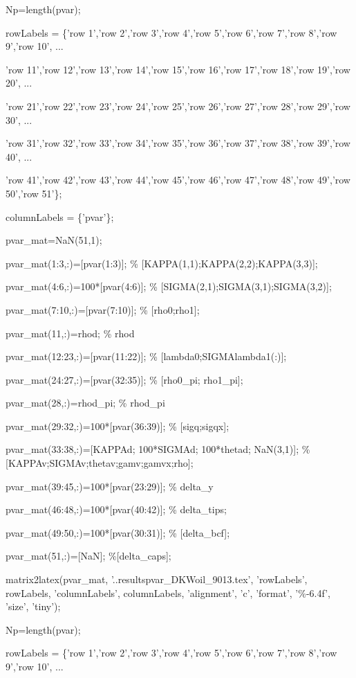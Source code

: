 \documentclass{article}
\begin{document}
Np=length(pvar);

rowLabels = \{'row 1','row 2','row 3','row 4','row 5','row 6','row 7','row
8','row 9','row 10', ...

'row 11','row 12','row 13','row 14','row 15','row 16','row 17','row 18','row
19','row 20', ...

'row 21','row 22','row 23','row 24','row 25','row 26','row 27','row 28','row
29','row 30', ...

'row 31','row 32','row 33','row 34','row 35','row 36','row 37','row 38','row
39','row 40', ...

'row 41','row 42','row 43','row 44','row 45','row 46','row 47','row 48','row
49','row 50','row 51'\};

columnLabels = \{'pvar'\};

pvar\_mat=NaN(51,1);

pvar\_mat(1:3,:)=[pvar(1:3)]; \% [KAPPA(1,1);KAPPA(2,2);KAPPA(3,3)];

pvar\_mat(4:6,:)=100*[pvar(4:6)]; \% [SIGMA(2,1);SIGMA(3,1);SIGMA(3,2)];

pvar\_mat(7:10,:)=[pvar(7:10)]; \% [rho0;rho1];

pvar\_mat(11,:)=rhod; \% rhod

pvar\_mat(12:23,:)=[pvar(11:22)]; \% [lambda0;SIGMAlambda1(:)];

pvar\_mat(24:27,:)=[pvar(32:35)]; \% [rho0\_pi; rho1\_pi];

pvar\_mat(28,:)=rhod\_pi; \% rhod\_pi

pvar\_mat(29:32,:)=100*[pvar(36:39)]; \% [sigq;sigqx];

pvar\_mat(33:38,:)=[KAPPAd; 100*SIGMAd; 100*thetad; NaN(3,1)]; \%
[KAPPAv;SIGMAv;thetav;gamv;gamvx;rho];

pvar\_mat(39:45,:)=100*[pvar(23:29)]; \% delta\_y

pvar\_mat(46:48,:)=100*[pvar(40:42)]; \% delta\_tips;

pvar\_mat(49:50,:)=100*[pvar(30:31)]; \% [delta\_bcf];

pvar\_mat(51,:)=[NaN]; \%[delta\_caps];

matrix2latex(pvar\_mat, '..\TEXTsymbol{\backslash}results\TEXTsymbol{%
\backslash}pvar\_DKWoil\_9013.tex', 'rowLabels', rowLabels, 'columnLabels',
columnLabels, 'alignment', 'c', 'format', '\%-6.4f', 'size', 'tiny');

Np=length(pvar);

rowLabels = \{'row 1','row 2','row 3','row 4','row 5','row 6','row 7','row
8','row 9','row 10', ...
\end{document}
